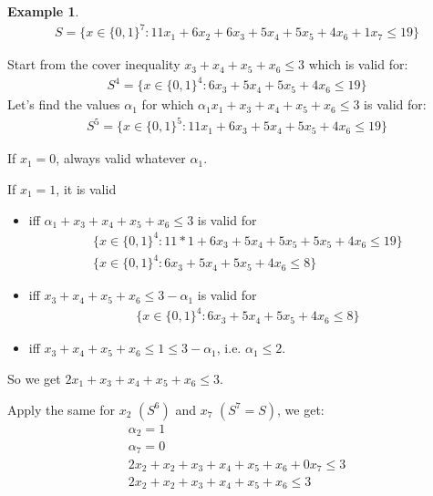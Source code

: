 \documentclass{article}
\theoremstyle{plain}
\theoremstyle{definition}
\newtheorem{eg}{Example}
\begin{document}
\begin{eg}
    \begin{align*}
        S = \{x\in\{0,1\}^7: 11x_1 + 6x_2 + 6x_3 + 5x_4 + 5x_5 + 4x_6 + 1x_7 \leq 19\}
    \end{align*}

    Start from the cover inequality $x_3 + x_4 + x_5 + x_6 \leq 3$ which is valid for:
    \begin{align*}
        S^4 = \{x\in\{0,1\}^4: 6x_3 + 5x_4 + 5x_5 + 4x_6 \leq 19\}
    \end{align*}
    Let's find the values $\alpha_1$ for which
    $\alpha_1x_1 + x_3 + x_4 + x_5 + x_6 \leq 3$ is valid for:
    \begin{align*}
        S^5 = \{x\in\{0,1\}^5: 11x_1 + 6x_3 + 5x_4 + 5x_5 + 4x_6\leq 19\}
    \end{align*}

    If $x_1 = 0$, always valid whatever $\alpha_1$.

    If $x_1 = 1$, it is valid
    \begin{itemize}
        \item iff $\alpha_1 + x_3 + x_4 + x_5 + x_6\leq 3$ is valid for
            \begin{gather*}
                \{x\in\{0,1\}^4: 11*1 + 6x_3 + 5x_4 + 5x_5 + 5x_5 + 4x_6\leq 19\}\\
                \{x\in\{0,1\}^4: 6x_3 + 5x_4 + 5x_5 + 4x_6\leq 8\}
            \end{gather*}
        \item iff $x_3 + x_4 + x_5 + x_6 \leq 3-\alpha_1$ is valid for
            \begin{align*}
                \{x\in\{0,1\}^4: 6x_3 + 5x_4 + 5x_5 + 4x_6\leq 8\}
            \end{align*}
        \item iff  $x_3 + x_4 + x_5 + x_6 \leq 1\leq 3-\alpha_1$, i.e. $\alpha_1\leq 2$.
    \end{itemize}

    So we get $2x_1 + x_3 + x_4 + x_5 + x_6 \leq 3$.

    Apply the same for $x_2$ $(S^6)$ and $x_7$ $(S^7 = S)$, we get:
    \begin{gather*}
        \alpha_2 = 1\\
        \alpha_7 = 0\\
        2x_2 + x_2 + x_3 + x_4 + x_5 + x_6 + 0x_7 \leq 3\\
        2x_2 + x_2 + x_3 + x_4 + x_5 + x_6 \leq 3
    \end{gather*}
\end{eg}
\end{document}
